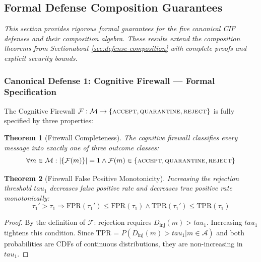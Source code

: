 \documentclass[
]{article}
\newtheorem{theorem}{Theorem}[section]
\begin{document}
\subsection{Formal Defense Composition
Guarantees}\label{sec:defense-formal-guarantees}

\emph{This section provides rigorous formal guarantees for the five
canonical CIF defenses and their composition algebra. These results
extend the composition theorems from
Sectionabout \ref{sec:defense-composition} with complete
proofs and explicit security bounds.}

\subsubsection{Canonical Defense 1: Cognitive Firewall --- Formal
Specification}\label{canonical-defense-1-cognitive-firewall-formal-specification}

The Cognitive Firewall
\(\mathcal{F}: \mathcal{M} \to \{\textsc{accept}, \textsc{quarantine}, \textsc{reject}\}\)
is fully specified by three properties:

\begin{theorem}[Firewall Completeness]
\label{thm:firewall-completeness}
The cognitive firewall classifies every message into exactly one of three outcome classes:
\begin{equation}
\label{eq:firewall-completeness}
\forall m \in \mathcal{M}: |\{\mathcal{F}(m)\}| = 1 \land \mathcal{F}(m) \in \{\textsc{accept}, \textsc{quarantine}, \textsc{reject}\}
\end{equation}
\end{theorem}

\begin{theorem}[Firewall False Positive Monotonicity]
\label{thm:firewall-fpr-monotone}
Increasing the rejection threshold $tau_1$ decreases false positive rate and decreases true positive rate monotonically:
\begin{equation}
\label{eq:firewall-fpr-monotone}
\tau_1' > \tau_1 \Rightarrow \text{FPR}(\tau_1') \leq \text{FPR}(\tau_1) \land \text{TPR}(\tau_1') \leq \text{TPR}(\tau_1)
\end{equation}
\end{theorem}

\begin{proof}
By the definition of $\mathcal{F}$: rejection requires $D_{\text{inj}}(m) > tau_1$. Increasing $tau_1$ tightens this condition. Since TPR = $P(D_{\text{inj}}(m) > tau_1 | m \in \mathcal{A})$ and both probabilities are CDFs of continuous distributions, they are non-increasing in $tau_1$.
\end{proof}
\end{document}
